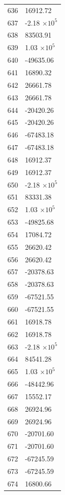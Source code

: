 \documentclass[a4paper,11pt]{article}
\begin{document}
\begin{center}
\begin{longtable}{|R{1.5cm}|R{2.5cm}|}
  636 &     16912.72 \\
  637 &        -2.18 $\times 10^{           5}$ \\
  638 &     83503.91 \\
  639 &         1.03 $\times 10^{           5}$ \\
  640 &    -49635.06 \\
  641 &     16890.32 \\
  642 &     26661.78 \\
  643 &     26661.78 \\
  644 &    -20420.26 \\
  645 &    -20420.26 \\
  646 &    -67483.18 \\
  647 &    -67483.18 \\
  648 &     16912.37 \\
  649 &     16912.37 \\
  650 &        -2.18 $\times 10^{           5}$ \\
  651 &     83331.38 \\
  652 &         1.03 $\times 10^{           5}$ \\
  653 &    -49825.68 \\
  654 &     17084.72 \\
  655 &     26620.42 \\
  656 &     26620.42 \\
  657 &    -20378.63 \\
  658 &    -20378.63 \\
  659 &    -67521.55 \\
  660 &    -67521.55 \\
  661 &     16918.78 \\
  662 &     16918.78 \\
  663 &        -2.18 $\times 10^{           5}$ \\
  664 &     84541.28 \\
  665 &         1.03 $\times 10^{           5}$ \\
  666 &    -48442.96 \\
  667 &     15552.17 \\
  668 &     26924.96 \\
  669 &     26924.96 \\
  670 &    -20701.60 \\
  671 &    -20701.60 \\
  672 &    -67245.59 \\
  673 &    -67245.59 \\
  674 &     16800.66 \\

\end{longtable}
\end{center}
\end{document}

